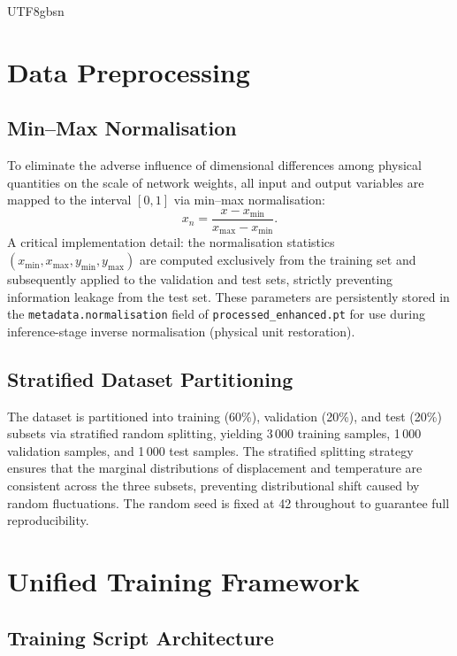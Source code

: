 \documentclass[a4paper,12pt]{report}
\begin{document}
\begin{CJK}{UTF8}{gbsn}
\section{Data Preprocessing}
\label{sec:preprocessing}

\subsection{Min--Max Normalisation}
\label{subsec:normalisation}

To eliminate the adverse influence of dimensional differences among physical quantities
on the scale of network weights, all input and output variables are mapped to the interval
$[0,1]$ via min--max normalisation:
\begin{equation}
  x_n = \frac{x - x_{\min}}{x_{\max} - x_{\min}}.
  \label{eq:normalisation}
\end{equation}
A critical implementation detail: the normalisation statistics $(x_{\min}, x_{\max},
y_{\min}, y_{\max})$ are computed exclusively from the training set and subsequently
applied to the validation and test sets, strictly preventing information leakage from the
test set. These parameters are persistently stored in the \texttt{metadata.normalisation}
field of \texttt{processed\_enhanced.pt} for use during inference-stage inverse
normalisation (physical unit restoration).

\subsection{Stratified Dataset Partitioning}
\label{subsec:partitioning}

The dataset is partitioned into training (60\%), validation (20\%), and test (20\%) subsets
via stratified random splitting, yielding 3\,000 training samples, 1\,000 validation
samples, and 1\,000 test samples. The stratified splitting strategy ensures that the
marginal distributions of displacement and temperature are consistent across the three
subsets, preventing distributional shift caused by random fluctuations. The random seed
is fixed at 42 throughout to guarantee full reproducibility.

\section{Unified Training Framework}
\label{sec:training_framework}

\subsection{Training Script Architecture}
\label{subsec:train_arch}


\end{CJK}
\end{document}
